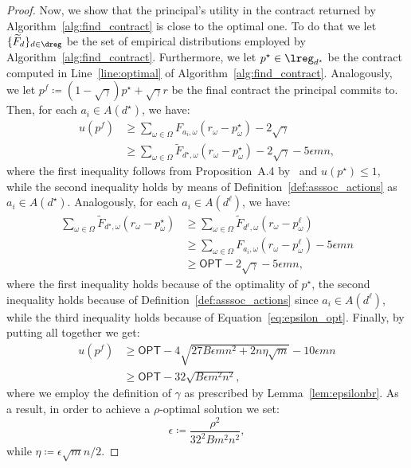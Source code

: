 \begin{proof}
	Now, we show that the principal's utility in the contract returned by Algorithm~\ref{alg:find_contract} is close to the optimal one. To do that we let $\{ \widetilde{F}_d\}_{d \in \dreg}$ be the set of empirical distributions employed by Algorithm~\ref{alg:find_contract}.
	Furthermore, we let $ p^\star \in \lreg_{d^\star}$ be the contract computed in Line~\ref{line:optimal} of Algorithm~\ref{alg:find_contract}. Analogously, we let $p^f \coloneqq (1-\sqrt{\gamma})p^{\star}  + \sqrt{\gamma} r$ be the final contract the principal commits to. Then, for each $a_i \in A(d^\star)$, we have:%
	\begin{align*}
		u(p^f)
		& \ge \sum_{\omega \in \Omega} {F}_{a_i, \omega} \left( r_\omega - p^\star_\omega \right)  - 2 \sqrt{\gamma} \\
		&  \ge \sum_{\omega \in \Omega} \widetilde{F}_{d^\star, \omega} \left( r_\omega - p^\star_\omega \right) - 2 \sqrt{\gamma} - 5 \epsilon m n,
	\end{align*}
	where the first inequality follows from Proposition~A.4 by~\citet{dutting2021complexity} and $u(p^\star)\le 1$, while the second inequality holds by means of Definition~\ref{def:asssoc_actions} as $a_i \in A(d^\star)$. Analogously, for each $a_i \in A(d^\ell)$, we have:
	\begin{align*}
		\sum_{\omega \in \Omega} \widetilde{F}_{d^\star, \omega} \left( r_\omega - p^\star_\omega \right)  
		& \ge \sum_{\omega \in \Omega} \widetilde{F}_{d^\ell, \omega} \left( r_\omega - p^\ell_\omega \right) \\
		& \ge \sum_{\omega \in \Omega} F_{a_i, \omega} \left( r_\omega - p^\ell_\omega \right) - 5 \epsilon m n \\
		&\ge  \mathsf{OPT}  - 2 \sqrt{\gamma} -  5\epsilon m n,
	\end{align*}
	where the first inequality holds because of the optimality of $p^\star$, the second inequality holds because of Definition~\ref{def:asssoc_actions} since $a_i \in A(d^\ell)$, while the third inequality holds because of Equation~\ref{eq:epsilon_opt}.
	Finally, by putting all together we get:
	\begin{align*}
		u(p^f) & \ge \mathsf{OPT} - 4 \sqrt{27 B \epsilon m n^2 + 2  n \eta \sqrt{m}} - 10 \epsilon m n \\
		& \ge \mathsf{OPT} - 32 \sqrt{B \epsilon m^2 n^2},
	\end{align*}
	where we employ the definition of $\gamma$ as prescribed by Lemma~\ref{lem:epsilonbr}. As a result, in order to achieve a $\rho$-optimal solution we set:
	\begin{equation*}
		\epsilon \coloneqq \frac{\rho^2}{32^2 B m^2 n^2},
	\end{equation*}
	while $\eta \coloneqq \epsilon \sqrt{m} n /2$.
\end{proof}



